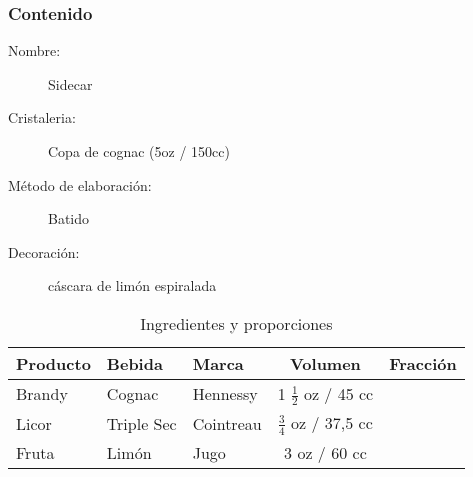 \bigskip 
\bigskip 
\subsubsection{Contenido}
\bigskip 

\begin{description}
\item[Nombre:] Sidecar
\item[Cristaleria:] Copa de cognac (5oz / 150cc)
\item[M\'etodo de elaboraci\'on:] Batido
\item[Decoraci\'on:] c\'ascara de lim\'on espiralada
\end{description}

\begin{table}[h]
\caption{Ingredientes y proporciones} 
\label{tab:fonts}
\begin{center}       
\begin{tabular}{|l|l|l|c|l|} %
\hline
\rule[-1ex]{0pt}{3.5ex}  \textbf{Producto} & \textbf{Bebida} & \textbf{Marca} & \textbf{Volumen} & \textbf{Fracci\'on}  \\
\hline
\rule[-1ex]{0pt}{3.5ex}  Brandy		& Cognac			& Hennessy		 		& 1  $\frac{1}{2}$ oz / 45 cc 	&  	\\
\hline
\rule[-1ex]{0pt}{3.5ex}  Licor 		& Triple Sec 	& Cointreau 				& $\frac{3}{4}$ oz / 37,5 cc 		&  	\\
\hline
\rule[-1ex]{0pt}{3.5ex}  Fruta 		& Lim\'on	 	& Jugo	 				& 3 oz / 60 cc					& 	\\
\hline
\end{tabular}
\end{center}
\end{table} 
\bigskip 

